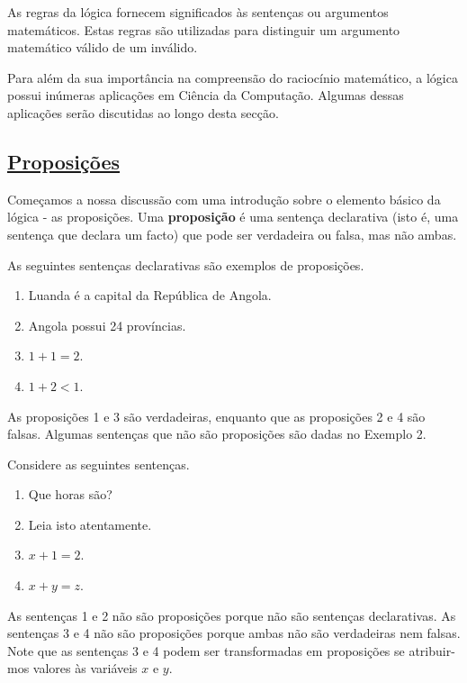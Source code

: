 As regras da lógica fornecem significados às sentenças ou argumentos
matemáticos. Estas regras são utilizadas para distinguir um argumento matemático
válido de um inválido.

Para além da sua importância na compreensão do raciocínio matemático, a lógica
possui inúmeras aplicações em Ciência da Computação. Algumas dessas aplicações
serão discutidas ao longo desta secção.

\subsection*{\underline{Proposições}}

Começamos a nossa discussão com uma introdução sobre o elemento básico da lógica
- as proposições. Uma \textbf{proposição} é uma sentença declarativa (isto é,
uma sentença que declara um facto) que pode ser verdadeira ou falsa, mas não
ambas.
%

\begin{exmp}
\label{exem11}
As seguintes sentenças declarativas são exemplos de proposições.
\end{exmp}
\begin{enumerate}
  	\item Luanda é a capital da República de Angola.
  	\item Angola possui 24 províncias.
  	\item $1 + 1 = 2$.
  	\item $1 + 2 < 1$.
\end{enumerate}

As proposições 1 e 3 são verdadeiras, enquanto que as proposições 2 e 4 são
falsas. Algumas sentenças que não são proposições são dadas no Exemplo 2.


\begin{exmp}
\label{exem12}
Considere as seguintes sentenças.\end{exmp}
\begin{enumerate}
  	\item Que horas são?
  	\item Leia isto atentamente.
  	\item $x + 1 = 2$.
  	\item $x + y = z$.
\end{enumerate}

As sentenças 1 e 2 não são proposições porque não são sentenças declarativas. As
sentenças 3 e 4 não são proposições porque ambas não são verdadeiras nem falsas.
Note que as sentenças 3 e 4 podem ser transformadas em proposições se
atribuir-mos valores às variáveis $x$ e $y$.

